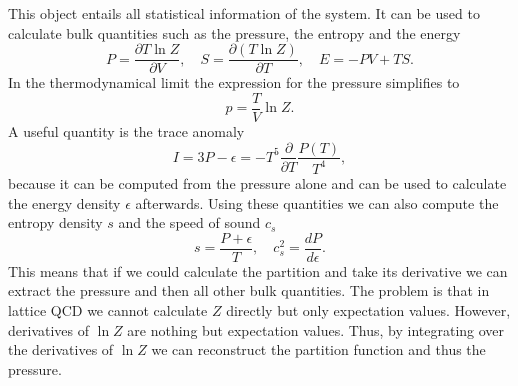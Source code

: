 This object entails all statistical information of the system. It can be used to calculate bulk quantities such as the pressure, the entropy and the energy\cite{kapusta}
\begin{equation}
    P=\frac{\partial T\ln Z}{\partial V},\quad S=\frac{\partial(T\ln Z)}{\partial T},\quad E=-PV+TS.   
\end{equation}
In the thermodynamical limit the expression for the pressure simplifies to 
\begin{equation}
    p=\frac{T}{V}\ln Z.
\end{equation}
A useful quantity is the trace anomaly
\begin{equation}
    I=3P-\epsilon=-T^5\frac{\partial}{\partial T}\frac{P(T)}{T^4},
\end{equation}
because it can be computed from the pressure alone and can be used to calculate the energy density $\epsilon$ afterwards. Using these quantities we can also compute the entropy density $s$ and the speed of sound $c_s$
\begin{equation}
    s=\frac{P+\epsilon}{T},\quad c_s^2=\frac{dP}{d\epsilon}.
\end{equation}
This means that if we could calculate the partition and take its derivative we can extract the pressure and then all other bulk quantities. The problem is that in lattice QCD we cannot calculate $Z$ directly but only expectation values. However, derivatives of $\ln Z$ are nothing but expectation values. Thus, by integrating over the derivatives of $\ln Z$ we can reconstruct the partition function and thus the pressure\cite{integralMethod}.


